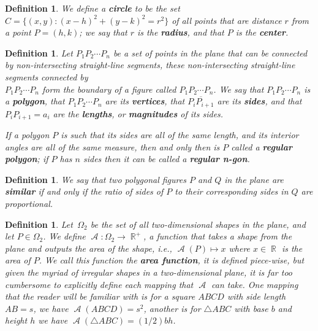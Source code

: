 \documentclass[letterpaper, 12pt]{amsart}
\DeclareMathOperator{\R}{\mathbb{R}}
\DeclareMathOperator{\A}{\mathcal{A}}
\newtheorem{defn}[thm]{Definition}
\theoremstyle{definition}  %
\begin{document}
		\begin{defn}
		\label{defn:circle}
		We define a \textbf{circle} to be the set $C = \{ (x,y) : (x - h)^{2} + (y - k)^{2} = r^{2} \}$ of all points that are distance $r$ from a point $P = (h,k)$; we say that $r$ is the \textbf{radius}, and that $P$ is the \textbf{center}.
		\end{defn}

		\begin{defn}
		\label{defn:polygon}
		Let $P_{1}P_{2} \cdots P_{n}$ be a set of points in the plane that can be connected by non-intersecting straight-line segments, these non-intersecting straight-line segments connected by \\
		$P_{1}P_{2} \cdots P_{n}$ form the boundary of a figure called $P_{1}P_{2} \cdots P_{n}$.
		We say that $P_{1}P_{2} \cdots P_{n}$ is a \textbf{polygon}, that $P_{1}P_{2} \cdots P_{n}$ are its \textbf{vertices}, that $\overline{P_{i}P_{i+1}}$ are its \textbf{sides}, and that $P_{i}P_{i+1} = a_{i}$ are the \textbf{lengths}, or \textbf{magnitudes} of its sides.

		If a polygon $P$ is such that its sides are all of the same length, and its interior angles are all of the same measure, then and only then is $P$ called a \textbf{regular polygon}; if $P$ has $n$ sides then it can be called a \textbf{regular n-gon}.
		\end{defn}

		\begin{defn}
		\label{defn:sim_polygons}
		We say that two polygonal figures $P$ and $Q$ in the plane are \textbf{similar} if and only if the ratio of sides of $P$ to their corresponding sides in $Q$ are proportional.
		\end{defn}

		\begin{defn}
		\label{defn:area_function}
		Let $\, \Omega_{2}$ be the set of all two-dimensional shapes in the plane, and let $P \in \Omega_{2}$.
		We define $\A : \Omega_{2} \to \R^{+}$, a function that takes a shape from the plane and outputs the area of the shape, i.e., $\A(P) \mapsto x$ where $x \in \R$ is the area of $P$.
		We call this function the \textbf{area function}, it is defined piece-wise, but given the myriad of irregular shapes in a two-dimensional plane, it is far too cumbersome to explicitly define each mapping that $\A$ can take.
		One mapping that the reader will be familiar with is for a square $ABCD$ with side length $AB = s$, we have $\A(ABCD) = s^{2}$, another is for $\triangle ABC$ with base $b$ and height $h$ we have $\A(\triangle ABC) = (1/2)bh$.
		\end{defn}
\end{document}
